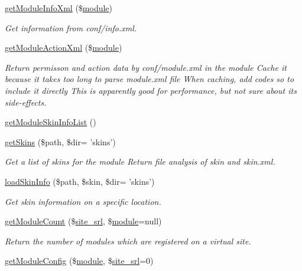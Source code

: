 \begin{DoxyCompactItemize}
\hyperlink{classmoduleModel_ae4e9287674bddc605dfc4cef77f8c1bb}{get\+Module\+Info\+Xml} (\$\hyperlink{classmodule}{module})
\begin{DoxyCompactList}\small\item\em Get information from conf/info.\+xml. \end{DoxyCompactList}\item 
\hyperlink{classmoduleModel_a2d53da77f2504357f99b93a2ad09981a}{get\+Module\+Action\+Xml} (\$\hyperlink{classmodule}{module})
\begin{DoxyCompactList}\small\item\em Return permisson and action data by conf/module.\+xml in the module Cache it because it takes too long to parse module.\+xml file When caching, add codes so to include it directly This is apparently good for performance, but not sure about its side-\/effects. \end{DoxyCompactList}\item 
\hyperlink{classmoduleModel_a9fae8e7a41eda8e384cb46d25430ae82}{get\+Module\+Skin\+Info\+List} ()
\item 
\hyperlink{classmoduleModel_af48d0cb71ef8e732a67872f80d95f884}{get\+Skins} (\$path, \$dir= 'skins')
\begin{DoxyCompactList}\small\item\em Get a list of skins for the module Return file analysis of skin and skin.\+xml. \end{DoxyCompactList}\item 
\hyperlink{classmoduleModel_af2f585723dfb8b8993f0e884136e45bb}{load\+Skin\+Info} (\$path, \$skin, \$dir= 'skins')
\begin{DoxyCompactList}\small\item\em Get skin information on a specific location. \end{DoxyCompactList}\item 
\hyperlink{classmoduleModel_a2b22943c4d212c8284ef9780e0ebf3bd}{get\+Module\+Count} (\$\hyperlink{ko_8install_8php_a8b1406b4ad1048041558dce6bfe89004}{site\+\_\+srl}, \$\hyperlink{classmodule}{module}=null)
\begin{DoxyCompactList}\small\item\em Return the number of modules which are registered on a virtual site. \end{DoxyCompactList}\item 
\hyperlink{classmoduleModel_ae8005c8ab7ee3b9e6ddd7f71bb2b4698}{get\+Module\+Config} (\$\hyperlink{classmodule}{module}, \$\hyperlink{ko_8install_8php_a8b1406b4ad1048041558dce6bfe89004}{site\+\_\+srl}=0)

\end{DoxyCompactItemize}
